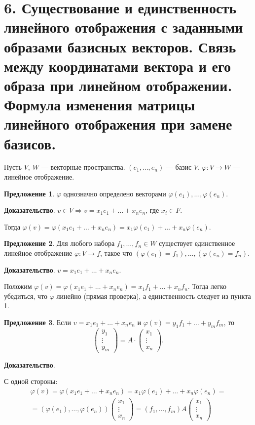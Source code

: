 \documentclass[a4paper, 12pt]{article}
\begin{document}
\section*{6. Существование и единственность линейного отображения с заданными образами базисных векторов. Связь между координатами вектора и его образа при линейном отображении. Формула изменения матрицы линейного отображения при замене базисов.}
Пусть $V,\ W$ --- векторные пространства. $(e_1, \ldots, e_n)$ --- базис $V$. $\varphi: V \rightarrow W$ --- линейное отображение.

\textbf{Предложение 1}. $\varphi$ однозначно определено векторами $\varphi(e_1), \ldots, \varphi(e_n)$.

\textbf{Доказательство}. $v \in V \Longrightarrow v = x_1e_1 + \ldots + x_ne_n$, где $x_i \in F$.

Тогда $\varphi(v) = \varphi(x_1e_1 + \ldots + x_ne_n) = x_1\varphi(e_1) + \ldots + x_n\varphi(e_n)$.

\vspace{5mm}
\textbf{Предложение 2}. Для любого набора $f_1, \ldots, f_n \in W$ существует единственное линейное отображение $\varphi: V \rightarrow f$, такое что $(\varphi(e_1) = f_1), \ldots, (\varphi(e_n) = f_n)$.

\textbf{Доказательство}. $v = x_1e_1 + \ldots + x_ne_n$.

Положим $\varphi(v) = \varphi(x_1e_1 + \ldots + x_ne_n) = x_1f_1 + \ldots + x_nf_n$. Тогда легко убедиться, что $\varphi$ линейно (прямая проверка), а единственность следует из пункта 1.

\vspace{5mm}
\textbf{Предложение 3}. Если $v = x_1e_1 + \ldots + x_ne_n$ и $\varphi(v) = y_1f_1 + \ldots + y_mf_m$, то
\vspace{-3mm}
\[
\begin{pmatrix}
y_1 \\
\vdots \\
y_m
\end{pmatrix} = A \cdot
\begin{pmatrix}
x_1 \\
\vdots \\
x_n
\end{pmatrix}.
\]

\textbf{Доказательство}.

С одной стороны:
\vspace{-3mm}
\begin{gather*}
\varphi(v) = \varphi(x_1e_1 + \ldots + x_ne_n) = x_1\varphi(e_1) + \ldots + x_n\varphi(e_n) = \\ = (\varphi(e_1), \ldots, \varphi(e_n))
\begin{pmatrix}
x_1 \\
\vdots \\
x_n
\end{pmatrix} = (f_1, \ldots, f_m) A
\begin{pmatrix}
x_1 \\
\vdots \\
x_n
\end{pmatrix}
\end{gather*}
\end{document}
